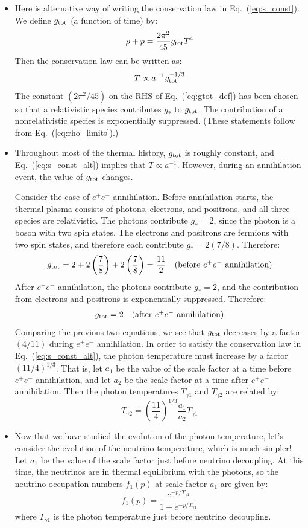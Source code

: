 \documentclass[aps,prd,superscriptaddress,groupedaddress,nofootinbib,nobibnotes]{revtex4}
\newcommand{\be}{\begin{equation}}
\newcommand{\ee}{\end{equation}}
\begin{document}
\begin{itemize}
\item
Here is alternative way of writing the conservation law in Eq.~(\ref{eq:s_const}).
We define $g_{\rm tot}$ (a function of time) by:
\be
\rho + p = \frac{2\pi^2}{45} g_{\rm tot} T^4  \label{eq:gtot_def}
\ee
Then the conservation law can be written as:
\be
T \propto a^{-1} g_{\rm tot}^{-1/3}  \label{eq:s_const_alt}
\ee
The constant $(2\pi^2/45)$ on the RHS of Eq.~(\ref{eq:gtot_def}) has been chosen so that a relativistic 
species contributes $g_*$ to $g_{\rm tot}$.  The contribution of a nonrelativistic species is exponentially 
suppressed.  (These statements follow from Eq.~(\ref{eq:rho_limits}).)

\item
Throughout most of the thermal history, $g_{\rm tot}$ is roughly constant, and Eq.~(\ref{eq:s_const_alt})
implies that $T \propto a^{-1}$.
However, during an annihilation event, the value of $g_{\rm tot}$ changes.  

Consider the case of $e^+e^-$ annihilation.
Before annihilation starts, the thermal plasma consists of photons, electrons, and positrons, and all three
species are relativistic.  The photons contribute $g_* = 2$, since the photon is a boson with two spin states.
The electrons and positrons are fermions with two spin states, and therefore each contribute $g_* = 2(7/8)$.
Therefore:
\begin{align}
g_{\rm tot} &= 2 + 2 \left( \frac{7}{8} \right) + 2 \left( \frac{7}{8} \right) = \frac{11}{2} & \mbox{(before $e^+e^-$ annihilation)}
\end{align}
After $e^+e^-$ annihilation, the photons contribute $g_* = 2$, and the contribution from electrons and positrons
is exponentially suppressed.  Therefore:
\begin{align}
g_{\rm tot} &= 2 & \mbox{(after $e^+e^-$ annihilation)}
\end{align}
Comparing the previous two equations, we see that $g_{\rm tot}$ decreases by a factor $(4/11)$ during $e^+e^-$ annihilation.
In order to satisfy the conservation law in Eq.~(\ref{eq:s_const_alt}), the photon temperature must increase by a factor $(11/4)^{1/3}$.
That is, let $a_1$ be the value of the scale factor at a time before $e^+e^-$ annihilation, and let $a_2$ be the scale
factor at a time after $e^+e^-$ annihilation.  Then the photon temperatures $T_{\gamma 1}$ and $T_{\gamma 2}$ are related by:
\be
T_{\gamma 2} = \left( \frac{11}{4} \right)^{1/3} \frac{a_1}{a_2} T_{\gamma 1}  \label{eq:photon_temperature}
\ee

\item
Now that we have studied the evolution of the photon temperature, let's consider the evolution of the neutrino temperature,
which is much simpler!
Let $a_1$ be the value of the scale factor just before neutrino decoupling.
At this time, the neutrinos are in thermal equilibrium with the photons, so the neutrino occupation numbers $f_1(p)$ 
at scale factor $a_1$ are given by:
\be
f_1(p) = \frac{e^{-p/T_{\gamma 1}}}{1 + e^{-p/T_{\gamma 1}}}
\ee
where $T_{\gamma 1}$ is the photon temperature just before neutrino decoupling.


\end{itemize}
\end{document}
